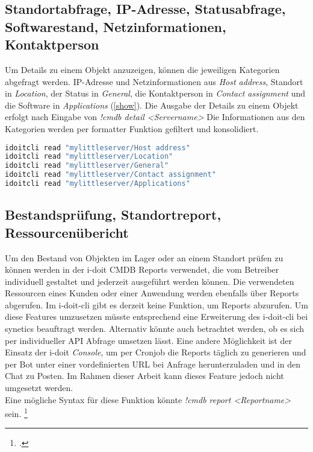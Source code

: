 \subsection{Standortabfrage, IP-Adresse, Statusabfrage, Softwarestand, Netzinformationen, Kontaktperson}
Um Details zu einem Objekt anzuzeigen, können die jeweiligen Kategorien abgefragt werden. IP-Adresse und Netzinformationen aus \textit{Host address}, Standort in \textit{Location}, der Status in \textit{General}, die Kontaktperson in \textit{Contact assignment} und die Software in \textit{Applications} (\autoref{show}). Die Ausgabe der Details zu einem Objekt erfolgt nach Eingabe von \textit{!cmdb detail <Servername>} Die Informationen aus den Kategorien werden per formatter Funktion gefiltert und konsolidiert.

\begin{lstlisting}[language=bash, label=show, caption=Detailansicht eines Objekts mit i-doit-cli]
idoitcli read "mylittleserver/Host address"
idoitcli read "mylittleserver/Location"
idoitcli read "mylittleserver/General"
idoitcli read "mylittleserver/Contact assignment"
idoitcli read "mylittleserver/Applications"
\end{lstlisting}

\subsection{Bestandsprüfung, Standortreport, Ressourcenübericht}
Um den Bestand von Objekten im Lager oder an einem Standort prüfen zu können werden in der i-doit \acs{CMDB} Reports verwendet, die vom Betreiber individuell gestaltet und jederzeit ausgeführt werden können. Die verwendeten Ressourcen eines Kunden oder einer Anwendung werden ebenfalls über Reports abgerufen.  Im i-doit-cli gibt es derzeit keine Funktion, um Reports abzurufen. Um diese Features umzusetzen müsste entsprechend eine Erweiterung des i-doit-cli bei synetics beauftragt werden. Alternativ könnte auch betrachtet werden, ob es sich per individueller API Abfrage umsetzen lässt. Eine andere Möglichkeit ist der Einsatz der i-doit \textit{Console}, um per Cronjob die Reports täglich zu generieren und per Bot unter einer vordefinierten URL bei Anfrage herunterzuladen und in den Chat zu Posten. Im Rahmen dieser Arbeit kann dieses Feature jedoch nicht umgesetzt werden.\\
Eine mögliche Syntax für diese Funktion könnte \textit{!cmdb report <Reportname>} sein. 
\footcites[Vgl.][o. \pno]{idoit_2019_report}[Vgl.][o. \pno]{idoit_2019_console}

